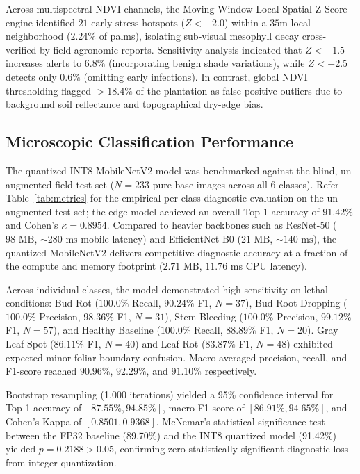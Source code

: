 \documentclass[conference,a4paper]{IEEEtran}
\begin{document}
Across multispectral NDVI channels, the Moving-Window Local Spatial Z-Score engine identified $21\text{ early stress hotspots}$ ($Z < -2.0$) within a $35\text{m}$ local neighborhood ($2.24\%$ of palms), isolating sub-visual mesophyll decay cross-verified by field agronomic reports. Sensitivity analysis indicated that $Z < -1.5$ increases alerts to $6.8\%$ (incorporating benign shade variations), while $Z < -2.5$ detects only $0.6\%$ (omitting early infections). In contrast, global NDVI thresholding flagged $>18.4\%$ of the plantation as false positive outliers due to background soil reflectance and topographical dry-edge bias.

\subsection{Microscopic Classification Performance}
The quantized INT8 MobileNetV2 model was benchmarked against the blind, un-augmented field test set ($N=233$ pure base images across all 6 classes). Refer Table~\ref{tab:metrics} for the empirical per-class diagnostic evaluation on the un-augmented test set; the edge model achieved an overall Top-1 accuracy of $91.42\%$ and Cohen's $\kappa = 0.8954$. Compared to heavier backbones such as ResNet-50 ($98\text{ MB}$, $\sim 280\text{ ms}$ mobile latency) and EfficientNet-B0 ($21\text{ MB}$, $\sim 140\text{ ms}$), the quantized MobileNetV2 delivers competitive diagnostic accuracy at a fraction of the compute and memory footprint ($2.71\text{ MB}$, $11.76\text{ ms}$ CPU latency).

Across individual classes, the model demonstrated high sensitivity on lethal conditions: Bud Rot ($100.0\%$ Recall, $90.24\%$ F1, $N=37$), Bud Root Dropping ($100.0\%$ Precision, $98.36\%$ F1, $N=31$), Stem Bleeding ($100.0\%$ Precision, $99.12\%$ F1, $N=57$), and Healthy Baseline ($100.0\%$ Recall, $88.89\%$ F1, $N=20$). Gray Leaf Spot ($86.11\%$ F1, $N=40$) and Leaf Rot ($83.87\%$ F1, $N=48$) exhibited expected minor foliar boundary confusion. Macro-averaged precision, recall, and F1-score reached $90.96\%$, $92.29\%$, and $91.10\%$ respectively.

Bootstrap resampling (1,000 iterations) yielded a 95\% confidence interval for Top-1 accuracy of $[87.55\%, 94.85\%]$, macro F1-score of $[86.91\%, 94.65\%]$, and Cohen's Kappa of $[0.8501, 0.9368]$. McNemar's statistical significance test between the FP32 baseline (89.70\%) and the INT8 quantized model (91.42\%) yielded $p = 0.2188 > 0.05$, confirming zero statistically significant diagnostic loss from integer quantization.
\end{document}
